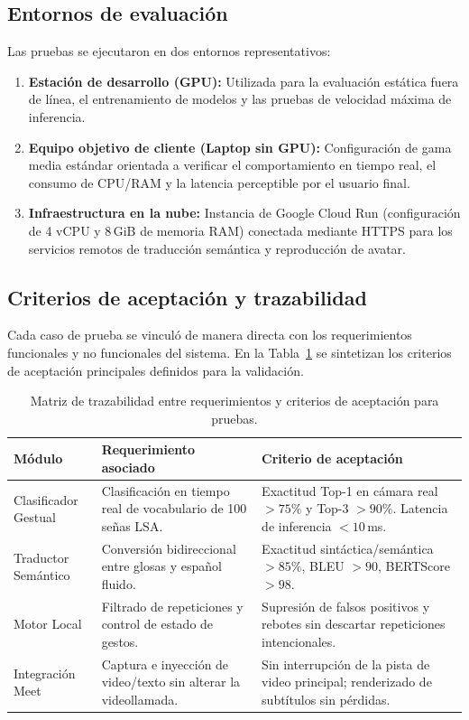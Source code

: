 \subsection{Entornos de evaluación}
Las pruebas se ejecutaron en dos entornos representativos:
\begin{enumerate}
    \item \textbf{Estación de desarrollo (GPU):} Utilizada para la evaluación estática fuera de línea, el entrenamiento de modelos y las pruebas de velocidad máxima de inferencia.
    \item \textbf{Equipo objetivo de cliente (Laptop sin GPU):} Configuración de gama media estándar orientada a verificar el comportamiento en tiempo real, el consumo de CPU/RAM y la latencia perceptible por el usuario final.
    \item \textbf{Infraestructura en la nube:} Instancia de Google Cloud Run (configuración de 4 vCPU y 8\,GiB de memoria RAM) conectada mediante HTTPS para los servicios remotos de traducción semántica y reproducción de avatar.
\end{enumerate}

\subsection{Criterios de aceptación y trazabilidad}
Cada caso de prueba se vinculó de manera directa con los requerimientos funcionales y no funcionales del sistema. En la Tabla~\ref{tab:trazabilidad_pruebas} se sintetizan los criterios de aceptación principales definidos para la validación.

\begin{table}[H]
    \centering
    \small
    \caption{Matriz de trazabilidad entre requerimientos y criterios de aceptación para pruebas.}
    \label{tab:trazabilidad_pruebas}
    \begin{tabularx}{\textwidth}{l X X}
        \toprule
        \textbf{Módulo} & \textbf{Requerimiento asociado} & \textbf{Criterio de aceptación} \\
        \midrule
        Clasificador Gestual & Clasificación en tiempo real de vocabulario de 100 señas LSA. & Exactitud Top-1 en cámara real $> 75\%$ y Top-3 $> 90\%$. Latencia de inferencia $< 10$\,ms. \\
        Traductor Semántico & Conversión bidireccional entre glosas y español fluido. & Exactitud sintáctica/semántica $> 85\%$, BLEU $> 90$, BERTScore $> 98$. \\
        Motor Local & Filtrado de repeticiones y control de estado de gestos. & Supresión de falsos positivos y rebotes sin descartar repeticiones intencionales. \\
        Integración Meet & Captura e inyección de video/texto sin alterar la videollamada. & Sin interrupción de la pista de video principal; renderizado de subtítulos sin pérdidas. \\
        \bottomrule
    \end{tabularx}
\end{table}

